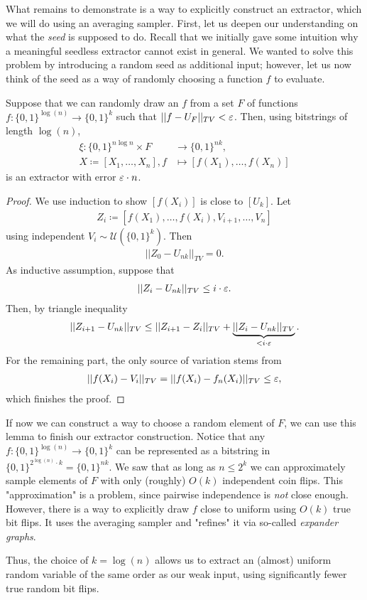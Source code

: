 What remains to demonstrate is a way to explicitly construct an extractor, which we will do
using an averaging sampler.
First, let us deepen our understanding on what the \emph{seed} is supposed to do.
Recall that we initially gave some intuition why a meaningful seedless extractor cannot exist in general.
We wanted to solve this problem by introducing a random seed as additional input;
however, let us now think of the seed as a way of randomly choosing a function $f$ to evaluate.
\begin{lemma}
    Suppose that we can randomly draw an $f$ from a set $F$ of functions
    $f : \{0,1\}^{\log(n)} \rightarrow \{0,1\}^k$
    such that $||f - U_F||_{TV} < \varepsilon$.
    Then, using bitstrings of length $\log(n)$,
    \begin{align*}
        \xi : \{0,1\}^{n \log n} \times F & \rightarrow \{0,1\}^{nk},       \\
        X \coloneqq [X_1, \dots, X_n], f  & \mapsto [f(X_1), \dots, f(X_n)]
    \end{align*}
    is an extractor with error $\varepsilon \cdot n$.
\end{lemma}
\begin{proof}
    We use induction to show $[f(X_i)]$ is close to $[U_k]$.
    Let
    \begin{align*}
        Z_i \coloneqq [f(X_1), \dots, f(X_i), V_{i+1}, \dots, V_n]
    \end{align*}
    using independent $V_i \sim \mathcal U(\{0,1\}^k)$.
    Then
    \begin{align*}
        ||Z_0 - U_{nk}||_{TV} = 0.
    \end{align*}
    As inductive assumption, suppose that
    \begin{align*}
        ||Z_i - U_{nk}||_{TV} \leq i\cdot \varepsilon.
    \end{align*}
    Then, by triangle inequality
    \begin{align*}
        ||Z_{i+1} - U_{nk}||_{TV} \leq ||Z_{i+1} - Z_i||_{TV} + \underbrace{||Z_i - U_{nk}||_{TV}}_{< i \cdot \varepsilon}.
    \end{align*}
    For the remaining part, the only source of variation stems from
    \begin{align*}
        ||f(X_i) - V_i||_{TV} = ||f(X_i) - f_n(X_i)||_{TV} \leq \varepsilon,
    \end{align*}
    which finishes the proof.
\end{proof}
If now we can construct a way to choose a random element of $F$, we can use this lemma to
finish our extractor construction.
Notice that any $f : \{0,1\}^{\log(n)} \rightarrow \{0,1\}^k$ can be represented as a
bitstring in $\{0,1\}^{2^{\log(n)}\cdot k} = \{0,1\}^{nk}$.
We saw that as long as $n \leq 2^k$ we can approximately sample elements
of $F$ with only (roughly) $O(k)$ independent coin flips.
This "approximation" is a problem, since pairwise independence is \emph{not} close enough.
However, there is a way to explicitly draw $f$ close to uniform
using $O(k)$ true bit flips.
It uses the averaging sampler and "refines" it via so-called \emph{expander graphs}.

Thus, the choice of $k = \log(n)$ allows us to extract an (almost) uniform random variable
of the same order as our weak input, using significantly fewer true random bit flips.
